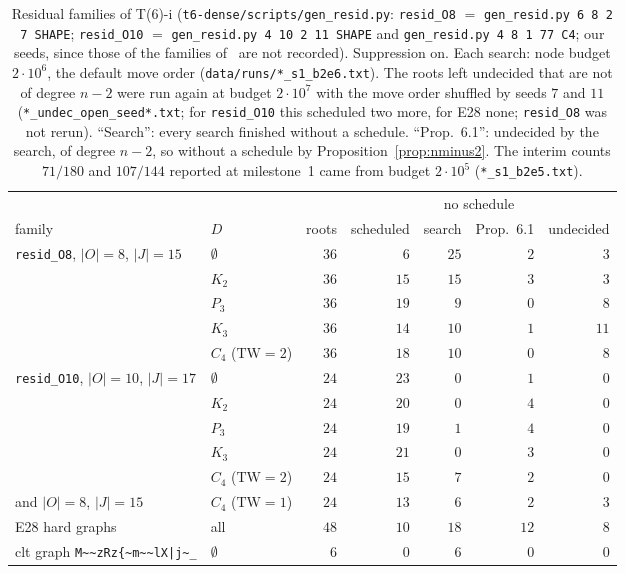 \documentclass[11pt]{amsart}
\theoremstyle{definition}
\begin{document}
\begin{table}[ht]
\caption{Residual families of T(6)-i (\texttt{t6-dense/scripts/gen\_resid.py}: \texttt{resid\_O8}
$=$ \texttt{gen\_resid.py 6 8 2 7 SHAPE}; \texttt{resid\_O10} $=$ \texttt{gen\_resid.py 4 10 2 11
SHAPE} and \texttt{gen\_resid.py 4 8 1 77 C4}; our seeds, since those of the families
of~\cite[\S6.3]{DT} are not recorded). Suppression on. Each search: node budget $2\cdot10^6$, the
default move order (\texttt{data/runs/*\_s1\_b2e6.txt}). The roots left undecided that are not of
degree $n-2$ were run again at budget $2\cdot10^7$ with the move order shuffled by seeds $7$ and $11$
(\texttt{*\_undec\_open\_seed*.txt}; for \texttt{resid\_O10} this scheduled two more, for E28 none;
\texttt{resid\_O8} was not rerun). ``Search'': every search finished without a schedule. ``Prop.~6.1'':
undecided by the search, of degree $n-2$, so without a schedule by Proposition~\ref{prop:nminus2}. The
interim counts $71/180$ and $107/144$ reported at milestone~1 came from budget $2\cdot10^5$
(\texttt{*\_s1\_b2e5.txt}).}\label{tab:resid}
\small
\begin{tabular}{@{}llrrrrr@{}}
\toprule
 & & & & \multicolumn{2}{c}{no schedule} & \\
family & $D$ & roots & scheduled & search & Prop.~6.1 & undecided\\
\midrule
\texttt{resid\_O8}, $|O|=8$, $|J|=15$ & $\emptyset$ & $36$ & $6$ & $25$ & $2$ & $3$\\
 & $K_2$ & $36$ & $15$ & $15$ & $3$ & $3$\\
 & $P_3$ & $36$ & $19$ & $9$ & $0$ & $8$\\
 & $K_3$ & $36$ & $14$ & $10$ & $1$ & $11$\\
 & $C_4$ ($\mathrm{TW}=2$) & $36$ & $18$ & $10$ & $0$ & $8$\\
\midrule
\texttt{resid\_O10}, $|O|=10$, $|J|=17$ & $\emptyset$ & $24$ & $23$ & $0$ & $1$ & $0$\\
 & $K_2$ & $24$ & $20$ & $0$ & $4$ & $0$\\
 & $P_3$ & $24$ & $19$ & $1$ & $4$ & $0$\\
 & $K_3$ & $24$ & $21$ & $0$ & $3$ & $0$\\
 & $C_4$ ($\mathrm{TW}=2$) & $24$ & $15$ & $7$ & $2$ & $0$\\
\phantom{x}\quad and $|O|=8$, $|J|=15$ & $C_4$ ($\mathrm{TW}=1$) & $24$ & $13$ & $6$ & $2$ & $3$\\
\midrule
E28 hard graphs~\cite[E28]{EXP} & all & $48$ & $10$ & $18$ & $12$ & $8$\\
clt graph \texttt{M\textasciitilde\textasciitilde zRz\{\textasciitilde m\textasciitilde\textasciitilde lX|j\textasciitilde\_} & $\emptyset$ & $6$ & $0$ & $6$ & $0$ & $0$\\
\bottomrule
\end{tabular}
\end{table}
\end{document}
